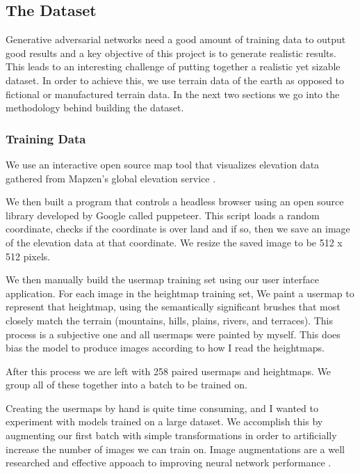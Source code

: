 \documentclass[twocolumn]{article}
\begin{document}
	\subsection{The Dataset}
	
	Generative adversarial networks need a good amount of training data to output good results and a key objective of this project is to generate realistic results. This leads to an interesting challenge of putting together a realistic yet sizable dataset. In order to achieve this, we use terrain data of the earth as opposed to fictional or manufactured terrain data. In the next two sections we go into the methodology behind building the dataset.

	\subsubsection{Training Data}
	
	We use an interactive open source map tool that visualizes elevation data gathered from Mapzen's global elevation service \cite{richardson2016mapzen}.
	
	We then built a program that controls a headless browser using an open source library developed by Google called puppeteer. This script loads a random coordinate, checks if the coordinate is over land and if so, then we save an image of the elevation data at that coordinate. We resize the saved image to be 512 x 512 pixels.
	
	We then manually build the usermap training set using our user interface application. For each image in the heightmap training set, We paint a usermap to represent that heightmap, using the semantically significant brushes that most closely match the terrain (mountains, hills, plains, rivers, and terraces). This process is a subjective one and all usermaps were painted by myself. This does bias the model to produce images according to how I read the heightmaps.

	After this process we are left with 258 paired usermaps and heightmaps. We group all of these together into a batch to be trained on.

	Creating the usermaps by hand is quite time consuming, and I wanted to experiment with models trained on a large dataset. We accomplish this by augmenting our first batch with simple transformations in order to artificially increase the number of images we can train on. Image augmentations are a well researched and effective appoach to improving neural network performance \cite{perez2017effectiveness}.
	
\end{document}
